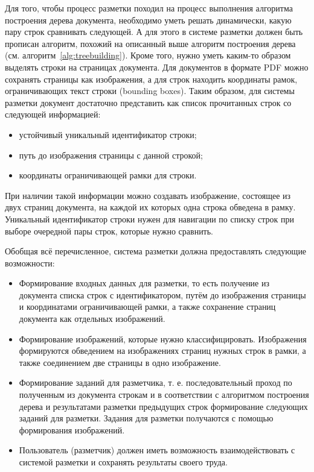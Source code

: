 Для того, чтобы процесс разметки походил на процесс выполнения алгоритма построения дерева документа, необходимо уметь решать динамически, какую пару строк сравнивать следующей.
А для этого в системе разметки должен быть прописан алгоритм, похожий на описанный выше алгоритм построения дерева (см. алгоритм~\ref{alg:treebuilding}).
Кроме того, нужно уметь каким-то образом выделять строки на страницах документа.
Для документов в формате PDF можно сохранять страницы как изображения, а для строк находить координаты рамок, ограничивающих текст строки (bounding boxes).
Таким образом, для системы разметки документ достаточно представить как список прочитанных строк со следующей информацией:
\begin{itemize}
    \item устойчивый уникальный идентификатор строки;
    \item путь до изображения страницы с данной строкой;
    \item координаты ограничивающей рамки для строки.
\end{itemize}
При наличии такой информации можно создавать изображение, состоящее из двух страниц документа, на каждой их которых одна строка обведена в рамку.
Уникальный идентификатор строки нужен для навигации по списку строк при выборе очередной пары строк, которые нужно сравнить.

Обобщая всё перечисленное, система разметки должна предоставлять следующие возможности:
\begin{itemize}
    \item Формирование входных данных для разметки, то есть получение из документа списка строк с
    идентификатором, путём до изображения страницы и координатами ограничивающей рамки, а также сохранение страниц документа как отдельных изображений.
    \item Формирование изображений, которые нужно классифицировать.
    Изображения формируются обведением на изображениях страниц нужных строк в рамки, а также соединением две страницы в одно изображение.
    \item Формирование заданий для разметчика, т. е. последовательный проход по полученным из документа строкам и в соответствии с алгоритмом построения дерева и результатами разметки предыдущих строк формирование следующих заданий для разметки.
    Задания для разметки получаются с помощью формирования изображений.
    \item Пользователь (разметчик) должен иметь возможность взаимодействовать с системой разметки и сохранять результаты своего труда.
\end{itemize}

